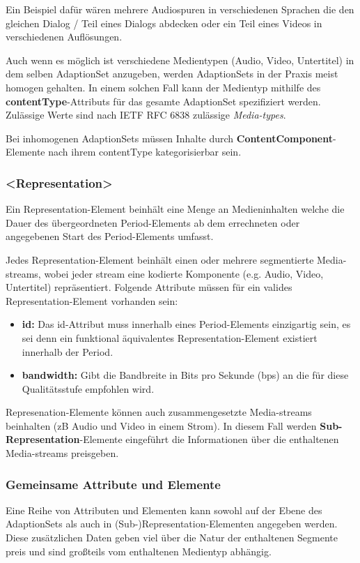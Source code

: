 \documentclass[paper = a4, fontsize = 12pt, parskip = half]{scrartcl} %
\begin{document}
Ein Beispiel dafür wären mehrere Audiospuren in verschiedenen Sprachen die den gleichen Dialog / Teil eines Dialogs abdecken oder ein Teil eines Videos in verschiedenen Auflösungen.

Auch wenn es möglich ist verschiedene Medientypen (Audio, Video, Untertitel) in dem selben AdaptionSet anzugeben, werden AdaptionSets in der Praxis meist homogen gehalten. In einem solchen Fall kann der Medientyp mithilfe des \textbf{contentType}-Attributs für das gesamte AdaptionSet spezifiziert werden. Zulässige Werte sind nach IETF RFC 6838 zulässige \textit{Media-types}.

Bei inhomogenen AdaptionSets müssen Inhalte durch \textbf{ContentComponent}-Elemente nach ihrem contentType kategorisierbar sein.

\subsubsection{<Representation>}
Ein Representation-Element beinhält eine Menge an Medieninhalten welche die Dauer des übergeordneten Period-Elements ab dem errechneten oder angegebenen Start des Period-Elements umfasst.

Jedes Representation-Element beinhält einen oder mehrere segmentierte Media-streams, wobei jeder stream eine kodierte Komponente (e.g. Audio, Video, Untertitel) repräsentiert. Folgende Attribute müssen für ein valides Representation-Element vorhanden sein:

\begin{itemize}
	\item \textbf{id:} Das id-Attribut muss innerhalb eines Period-Elements einzigartig sein, es sei denn ein funktional äquivalentes Representation-Element existiert innerhalb der Period.
	\item \textbf{bandwidth:} Gibt die Bandbreite in Bits pro Sekunde (bps) an die für diese Qualitätsstufe empfohlen wird.
\end{itemize}

Represenation-Elemente können auch zusammengesetzte Media-streams beinhalten (zB Audio und Video in einem Strom). In diesem Fall werden \textbf{Sub-Representation}-Elemente eingeführt die Informationen über die enthaltenen Media-streams preisgeben.

\subsubsection{Gemeinsame Attribute und Elemente}
Eine Reihe von Attributen und Elementen kann sowohl auf der Ebene des AdaptionSets als auch in (Sub-)Representation-Elementen angegeben werden. Diese zusätzlichen Daten geben viel über die Natur der enthaltenen Segmente preis und sind großteils vom enthaltenen Medientyp abhängig.
\end{document}
